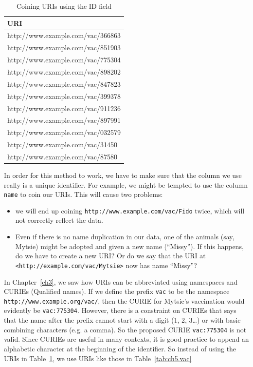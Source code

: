 \begin{table}
    \centering
    \begin{tabular}{|l |}
    \hline
    URI \\
    \hline\hline
http://www.example.com/vac/366863 \\
http://www.example.com/vac/851903 \\
http://www.example.com/vac/775304 \\
http://www.example.com/vac/898202 \\
http://www.example.com/vac/847823 \\
http://www.example.com/vac/399378 \\
http://www.example.com/vac/911236 \\
http://www.example.com/vac/897991 \\
http://www.example.com/vac/032579 \\
http://www.example.com/vac/31450 \\
http://www.example.com/vac/87580 \\
\hline
    \end{tabular}
    \caption{Coining URIs using the ID field }
    \label{tab:ch5.id}
\end{table}


In order for this method to work, we have to make sure that the column we use really is a unique  identifier. 
For example, we might be tempted to use the column \texttt{name} to coin our URIs.  
This will cause two problems: 

\begin{itemize}
    \item we will end up coining 
\texttt{http://www.example.com/vac/Fido} twice, which will not correctly reflect the data. 
\item Even if there is no  name duplication in our data, one of the animals (say, Mytsie) might be adopted and given a new name (``Missy'').  If this happens, do we have to create a new URI?   Or do we say that the URI at \texttt{<http://example.com/vac/Mytsie>} now has name ``Missy''?
\end{itemize}

In Chapter~\ref{ch3}, we saw how URIs can be abbreviated using namespaces and CURIEs (Qualified names). 
If we define the prefix \texttt{vac} to be the namespace
\texttt{http://www.example.org/vac/}, then the CURIE for Mytsie's vaccination would evidently   be
\texttt{vac:775304}.   However, there is a constraint on CURIEs \cite{Bray:08:EML} that says that the name after the 
 prefix cannot start with a digit (1, 2,
3\ldots{}) or with basic combining characters (e.g. a comma).  So the proposed CURIE \texttt{vac:775304} is not valid.  Since CURIEs are useful in many contexts, it is good practice to append an alphabetic character at the beginning of the identifier.  So instead of using the URIs in Table~\ref{tab:ch5.id}, we use URIs like those in Table~\ref{tab:ch5.vac}

